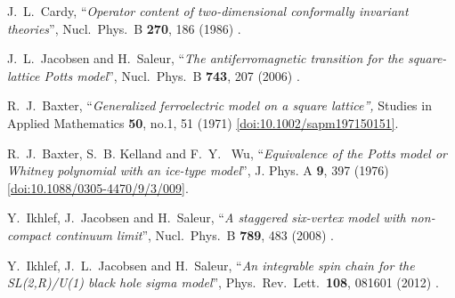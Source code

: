 \documentclass[12pt]{article}
\begin{document}
\begin{thebibliography}{99}




  J.~L.~Cardy,
 ``\emph{Operator content of two-dimensional conformally invariant theories}'',
  Nucl.\ Phys.\ B {\bf 270}, 186 (1986)
  \href{https://www.sciencedirect.com/science/article/pii/0550321386905523} {{\ttfamily [doi:10.1016/0550-3213(86)90552-3]}}.
  
  
  

  J.~L.~Jacobsen and H.~Saleur,
  ``\emph{The antiferromagnetic transition for the square-lattice Potts model}'',
  Nucl.\ Phys.\ B {\bf 743}, 207 (2006)
 \href{https://arxiv.org/abs/cond-mat/0512058}{{}}.



R.~J.~Baxter,
``\emph{Generalized ferroelectric model on a square lattice'',}
Studies in Applied Mathematics {\bf 50}, no.1, 51 (1971)
 \href{https://doi.org/10.1002/sapm197150151}{[doi:10.1002/sapm197150151]}.

R.~J.~Baxter, S.~B. Kelland and F.~Y. ~Wu,
``\emph{Equivalence of the Potts model or Whitney polynomial with
an ice-type model}'',
 J. Phys. A {\bf 9},
397 (1976)
 \href{https://iopscience.iop.org/article/10.1088/0305-4470/9/3/009}{[doi:10.1088/0305-4470/9/3/009]}.


  Y.~Ikhlef, J.~Jacobsen and H.~Saleur,
  ``\emph{A staggered six-vertex model with non-compact continuum limit}'',
  Nucl.\ Phys.\ B {\bf 789}, 483 (2008) \href{https://arxiv.org/abs/cond-mat/0612037}{{}}.




  Y.~Ikhlef, J.~L.~Jacobsen and H.~Saleur,
  ``\emph{An integrable spin chain for the SL(2,R)/U(1) black hole sigma model}'',
  Phys.\ Rev.\ Lett.\  {\bf 108}, 081601 (2012) \href{https://arxiv.org/abs/1109.1119}{{\ttfamily [arXiv:1109.1119]}}.


\end{thebibliography}
\end{document}
